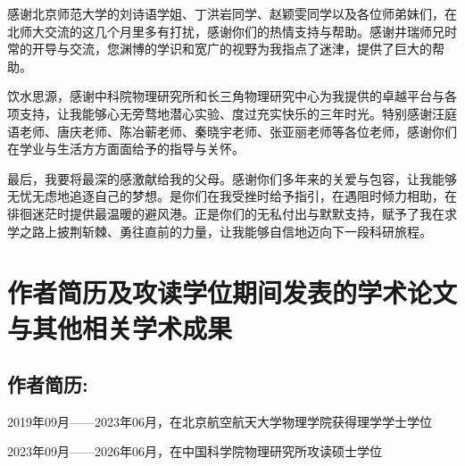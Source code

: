 感谢北京师范大学的刘诗语学姐、丁洪岩同学、赵颖雯同学以及各位师弟妹们，在北师大交流的这几个月里多有打扰，感谢你们的热情支持与帮助。感谢井瑞师兄时常的开导与交流，您渊博的学识和宽广的视野为我指点了迷津，提供了巨大的帮助。

饮水思源，感谢中科院物理研究所和长三角物理研究中心为我提供的卓越平台与各项支持，让我能够心无旁骛地潜心实验、度过充实快乐的三年时光。特别感谢汪庭语老师、唐庆老师、陈冶蕲老师、秦晓宇老师、张亚丽老师等各位老师，感谢你们在学业与生活方方面面给予的指导与关怀。

最后，我要将最深的感激献给我的父母。感谢你们多年来的关爱与包容，让我能够无忧无虑地追逐自己的梦想。是你们在我受挫时给予指引，在遇阻时倾力相助，在徘徊迷茫时提供最温暖的避风港。正是你们的无私付出与默默支持，赋予了我在求学之路上披荆斩棘、勇往直前的力量，让我能够自信地迈向下一段科研旅程。




\chapter{作者简历及攻读学位期间发表的学术论文与其他相关学术成果}

\section*{作者简历:}
2019年09月——2023年06月，在北京航空航天大学物理学院获得理学学士学位

2023年09月——2026年06月，在中国科学院物理研究所攻读硕士学位


